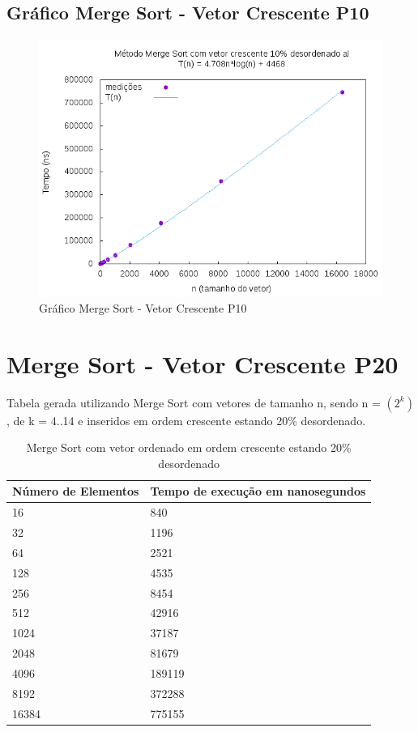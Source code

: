 \documentclass[12pt,a4paper,twoside]{report}
\begin{document}
\subsection{Gráfico Merge Sort - Vetor Crescente P10}
\begin{figure}[H]
    \centering
    \includegraphics[width=0.7\linewidth]{graficos/MergeSort/vIntCrescenteP10/vIntCrescenteP10.png}
  \caption{Gráfico Merge Sort - Vetor Crescente P10}
\end{figure}

\section{Merge Sort - Vetor Crescente P20}
Tabela gerada utilizando Merge Sort com vetores de tamanho n, sendo n = $(2^k)$, de k = 4..14 e inseridos em ordem crescente estando 20\% desordenado.
\begin{table}[H]
\centering
\caption{Merge Sort com vetor ordenado em ordem crescente estando 20\% desordenado}
\label{my-label}
\begin{tabular}{|l|l|}
\hline
\multicolumn{1}{|c|}{\textbf{Número de Elementos}} & \multicolumn{1}{c|}{\textbf{Tempo de execução em nanosegundos}} \\ \hline
16 & 840 \\ \hline
32 & 1196 \\ \hline
64 & 2521 \\ \hline
128 & 4535 \\ \hline
256 & 8454 \\ \hline
512 & 42916 \\ \hline
1024 & 37187 \\ \hline
2048 & 81679 \\ \hline
4096 & 189119 \\ \hline
8192 & 372288 \\ \hline
16384 & 775155 \\ \hline
\end{tabular}
\end{table}
\end{document}
